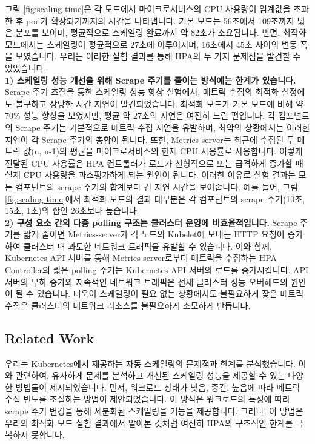 \documentclass[conference]{IEEEtran}
\begin{document}
그림 \ref{fig:scaling time}은 각 모드에서 마이크로서비스의 CPU 사용량이 임계값을 초과한 후 pod가 확장되기까지의 시간을 나타냅니다. 기본 모드는 56초에서 109초까지 넓은 분포를 보이며, 평균적으로 스케일링 완료까지 약 82초가 소요됩니다. 반면, 최적화 모드에서는 스케일링이 평균적으로 27초에 이루어지며, 16초에서 45초 사이의 변동 폭을 보였습니다. 우리는 이러한 실험 결과를 통해 HPA의 두 가지 문제점을 발견할 수 있었습니다.\\

\noindent\textbf{1) 스케일링 성능 개선을 위해 Scrape 주기를 줄이는 방식에는 한계가 있습니다.} Scrape 주기 조절을 통한 스케일링 성능 향상 실험에서, 메트릭 수집의 최적화 설정에도 불구하고 상당한 시간 지연이 발견되었습니다. 최적화 모드가 기본 모드에 비해 약 70\% 성능 향상을 보였지만, 평균 약 27초의 지연은 여전히 느린 편입니다. 각 컴포넌트의 Scrape 주기는 기본적으로 메트릭 수집 지연을 유발하며, 최악의 상황에서는 이러한 지연이 각 Scrape 주기의 총합이 됩니다. 또한, Metrics-server는 최근에 수집된 두 메트릭 값(n, n-1)의 평균을 마이크로서비스의 현재 CPU 사용률로 사용합니다. 이렇게 전달된 CPU 사용률은 HPA 컨트롤러가 로드가 선형적으로 또는 급격하게 증가할 때 실제 CPU 사용량을 과소평가하게 되는 원인이 됩니다. 이러한 이유로 실험 결과는 모든 컴포넌트의 scrape 주기의 합계보다 긴 지연 시간을 보여줍니다. 예를 들어, 그림 \ref{fig:scaling time}에서 최적화 모드의 결과 대부분은 각 컴포넌트의 scrape 주기(10초, 15초, 1초)의 합인 26초보다 높습니다.\\

\noindent\textbf{2) 구성 요소 간의 다중 polling 구조는 클러스터 운영에 비효율적입니다.}
Scrape 주기를 짧게 줄이면 Metrics-server가 각 노드의 Kubelet에 보내는 HTTP 요청이 증가하여 클러스터 내 과도한 네트워크 트래픽을 유발할 수 있습니다. 이와 함께, Kubernetes API 서버를 통해 Metrics-server로부터 메트릭을 수집하는 HPA Controller의 짧은 polling 주기는 Kubernetes API 서버의 로드를 증가시킵니다. API 서버의 부하 증가와 지속적인 네트워크 트래픽은 전체 클러스터 성능 오버헤드의 원인이 될 수 있습니다\cite{ExpediaGroupTech2020}. 더욱이 스케일링이 필요 없는 상황에서도 불필요하게 잦은 메트릭 수집은 클러스터의 네트워크 리소스를 불필요하게 소모하게 만듭니다.

\subsection{Related Work}
우리는 Kubernetes에서 제공하는 자동 스케일링의 문제점과 한계를 분석했습니다. 이와 관련하여, 유사하게 문제를 분석하고 개선된 스케일링 성능을 제공할 수 있는 다양한 방법들이 제시되었습니다.
먼저, 워크로드 상태가 낮음, 중간, 높음에 따라 메트릭 수집 빈도를 조절하는 방법이 제안되었습니다\cite{jiang2021fine}. 이 방식은 워크로드의 특성에 따라 scrape 주기 변경을 통해 세분화된 스케일링을 기능을 제공합니다. 그러나, 이 방법은 우리의 최적화 모드 실험 결과에서 알아본 것처럼 여전히 HPA의 구조적인 한계를 극복하지 못합니다.
\end{document}
